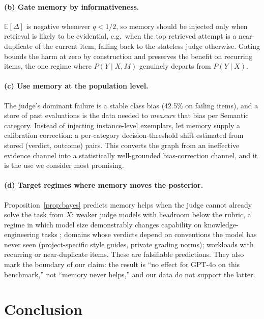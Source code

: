 \documentclass[]{ceurart}
\begin{document}
\paragraph{(b) Gate memory by informativeness.} $\mathbb{E}[\Delta]$ is negative whenever $q<1/2$, so memory should be injected only when retrieval is likely to be evidential, e.g.\ when the top retrieved attempt is a near-duplicate of the current item, falling back to the stateless judge otherwise. Gating bounds the harm at zero by construction and preserves the benefit on recurring items, the one regime where $P(Y\mid X,M)$ genuinely departs from $P(Y\mid X)$.

\paragraph{(c) Use memory at the population level.} The judge's dominant failure is a stable class bias (42.5\% on failing items), and a store of past evaluations is the data needed to \emph{measure} that bias per Semantic category. Instead of injecting instance-level exemplars, let memory supply a calibration correction: a per-category decision-threshold shift estimated from stored (verdict, outcome) pairs. This converts the graph from an ineffective evidence channel into a statistically well-grounded bias-correction channel, and it is the use we consider most promising.

\paragraph{(d) Target regimes where memory moves the posterior.} Proposition~\ref{prop:bayes} predicts memory helps when the judge cannot already solve the task from $X$: weaker judge models with headroom below the rubric, a regime in which model size demonstrably changes capability on knowledge-engineering tasks \citep{heim2025scaling}; domains whose verdicts depend on conventions the model has never seen (project-specific style guides, private grading norms); workloads with recurring or near-duplicate items. These are falsifiable predictions. They also mark the boundary of our claim: the result is ``no effect for GPT-4o on this benchmark,'' not ``memory never helps,'' and our data do not support the latter.

\section{Conclusion}
\end{document}
